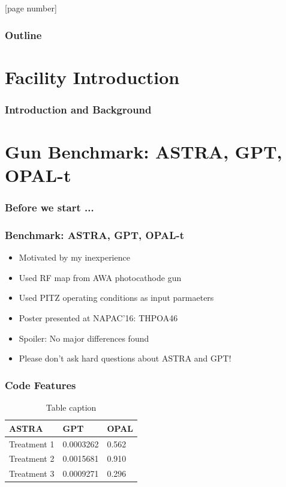 \documentclass{beamer}
\begin{document}
[page number]{




\begin{frame}
  \frametitle{Outline}
  \tableofcontents
\end{frame}
\section{Facility Introduction}
\begin{frame}
  \frametitle{Introduction and Background}
\end{frame}

\section{Gun Benchmark: ASTRA, GPT, OPAL-t}
\begin{frame}
  \frametitle{Before we start ...}
\end{frame}

\begin{frame}
  \frametitle{Benchmark: ASTRA, GPT, OPAL-t}
  \begin{itemize}
    \item{Motivated by my inexperience}
    \item{Used RF map from AWA photocathode gun}
    \item{Used PITZ operating conditions as input parmaeters}
    \item{Poster presented at NAPAC'16: THPOA46}
    \item{Spoiler: No major differences found}
    \item{Please don't ask hard questions about ASTRA and GPT!}
  \end{itemize}
\end{frame}

\begin{frame}
  \frametitle{Code Features}
\begin{table}
\begin{tabular}{l l l}
\toprule
\textbf{ASTRA} & \textbf{GPT} & \textbf{OPAL}\\
\midrule
Treatment 1 & 0.0003262 & 0.562 \\
Treatment 2 & 0.0015681 & 0.910 \\
Treatment 3 & 0.0009271 & 0.296 \\
\bottomrule
\end{tabular}
\caption{Table caption}
\end{table}


\end{frame}}
\end{document}
